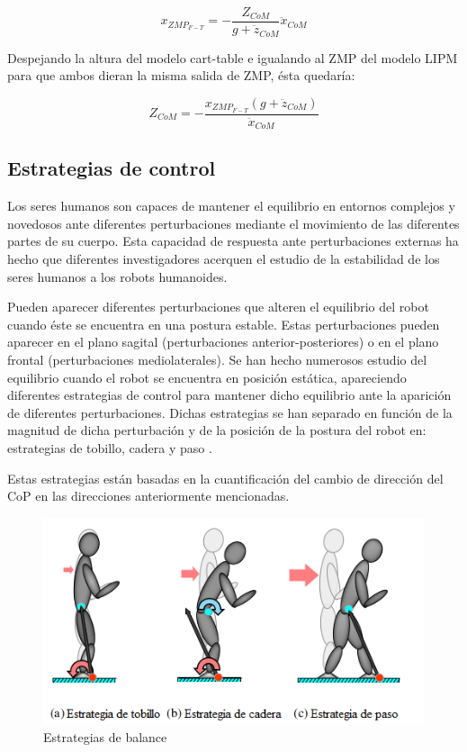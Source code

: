 \begin{equation}
x_{ZMP_{F-T}}=-\frac{Z_{CoM}}{g+\ddot{z}_{CoM}}\ddot{x}_{CoM}
\label{ec436}
\end{equation}

Despejando la altura del modelo cart-table e igualando al ZMP del modelo LIPM para que ambos dieran la misma salida de ZMP, ésta quedaría:

\begin{equation}
Z_{CoM}=-\frac{x_{ZMP_{F-T}}(g+\ddot{z}_{CoM})}{\ddot{x}_{CoM}}
\label{ec437}
\end{equation}



\newpage

\subsection{Estrategias de control}

Los seres humanos son capaces de mantener el equilibrio en entornos complejos y novedosos ante diferentes perturbaciones mediante el movimiento de las diferentes partes de su cuerpo. Esta capacidad de respuesta ante perturbaciones externas ha hecho que diferentes investigadores acerquen el estudio de la estabilidad de los seres humanos a los robots humanoides.

Pueden aparecer diferentes perturbaciones que alteren el equilibrio del robot cuando éste se encuentra en una postura estable. Estas perturbaciones pueden aparecer en el plano sagital (perturbaciones anterior-posteriores) o en el plano frontal (perturbaciones mediolaterales). Se han hecho numerosos estudio del equilibrio cuando el robot se encuentra en posición estática, apareciendo diferentes estrategias de control para mantener dicho equilibrio ante la aparición de diferentes perturbaciones. Dichas estrategias se han separado en función de la magnitud de dicha perturbación y de la posición de la postura del robot en: estrategias de tobillo, cadera y paso \cite{ref17} \cite{ref18}.

Estas estrategias están basadas en la cuantificación del cambio de dirección del CoP en las direcciones anteriormente mencionadas.

\begin{figure}[H]
\centering
\includegraphics[scale=0.8]{imagenes/apartado_4/49_balance_strategies}
\caption{Estrategias de balance}
\label{figura49}
\end{figure}


